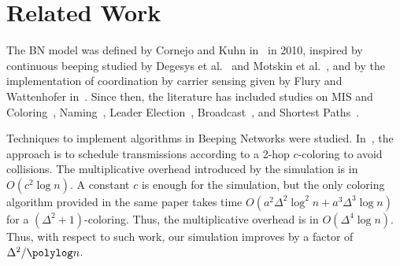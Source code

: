 \section{Related Work}
\label{sec:relwork}



The BN model was defined by Cornejo and Kuhn in~\cite{cornejo2010deploying} in 2010, inspired by 
continuous beeping studied by Degesys et al.~\cite{degesys2007desync} and Motskin et al.~\cite{motskin2009lightweight}, and by the implementation of coordination by carrier sensing given by Flury and Wattenhofer in~\cite{flury2010slotted}.
%
Since then, the literature has included studies on 
MIS and Coloring~\cite{afek2011biological,afek2013beeping,jeavons2016feedback,holzer2016brief,beauquier2018fast,casteigts2019design}, 
Naming~\cite{chlebus2017naming}, 
Leader Election~\cite{ghaffari2013near,forster2014deterministic,dufoulon2018beeping}, 
Broadcast~\cite{ghaffari2013near,hounkanli2015deterministic,hounkanli2016asynchronous,czumaj2019communicating,beauquier2019optimal},
and Shortest Paths~\cite{dufoulon2022beeping}.

Techniques to implement \congest algorithms in Beeping Networks were studied. In~\cite{beauquier2018fast},
the approach is to schedule transmissions according to a 2-hop $c$-coloring to avoid collisions. The multiplicative overhead introduced by the simulation is in $O(c^2 \log n)$. A constant $c$ is enough for the simulation, but the only coloring algorithm provided in the same paper takes time $O(a^2\Delta^2\log^2 n +a^3 \Delta^3 \log n)$ for a $(\Delta^2+1)$-coloring. Thus, the multiplicative overhead is in $O(\Delta^4 \log n)$. 
Thus, with respect to such work, our simulation improves by a factor of $\Delta^2/\polylog n$.

